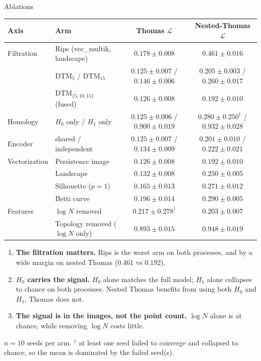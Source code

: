 \documentclass[aspectratio=169,10pt]{beamer}
\newcommand{\Loss}{\mathcal{L}}
\newcommand{\DTM}{\mathrm{DTM}}
\begin{document}
\begin{frame}{Ablations}
\centering\scriptsize
\begin{tabular}{llcc}
\toprule
Axis & Arm & Thomas $\Loss$ & Nested-Thomas $\Loss$ \\
\midrule
Filtration    & Rips (vec\_multik, landscape) & $0.178 \pm 0.008$ & $0.461 \pm 0.016$ \\
              & $\DTM_5$ / $\DTM_{15}$ & $0.125 \pm 0.007$ / $0.146 \pm 0.006$ & $0.205 \pm 0.003$ / $0.260 \pm 0.017$ \\
              & $\DTM_{\{5,10,15\}}$ (fused) & $0.126 \pm 0.008$ & $0.192 \pm 0.010$ \\
Homology      & $H_0$ only / $H_1$ only & $0.125 \pm 0.006$ / $0.900 \pm 0.019$ & $0.280 \pm 0.250^{\dagger}$ / $0.932 \pm 0.028$ \\
Encoder       & shared / independent & $0.125 \pm 0.007$ / $0.134 \pm 0.009$ & $0.201 \pm 0.010$ / $0.222 \pm 0.021$ \\
Vectorization & Persistence image & $0.126 \pm 0.008$ & $0.192 \pm 0.010$ \\
              & Landscape & $0.132 \pm 0.008$ & $0.250 \pm 0.005$ \\
              & Silhouette ($p=1$) & $0.165 \pm 0.013$ & $0.271 \pm 0.012$ \\
              & Betti curve & $0.196 \pm 0.014$ & $0.290 \pm 0.005$ \\
Features      & $\log N$ removed & $0.217 \pm 0.278^{\dagger}$ & $0.203 \pm 0.007$ \\
              & Topology removed ($\log N$ only) & $0.893 \pm 0.015$ & $0.948 \pm 0.019$ \\
\bottomrule
\end{tabular}
\vspace{8pt}

\raggedright\footnotesize
\begin{enumerate}\setlength\itemsep{2pt}
  \item \textbf{The filtration matters.} Rips is the worst arm on both
        processes, and by a wide margin on nested Thomas
        ($0.461$ vs $0.192$).
  \item \textbf{$H_0$ carries the signal.} $H_0$ alone matches the full model;
        $H_1$ alone collapses to chance on both processes. Nested Thomas benefits from using both $H_0$ and $H_1$, Thomas does not.
  \item \textbf{The signal is in the images, not the point count.} $\log N$
        alone is at chance, while removing $\log N$ costs little.
\end{enumerate}
\vspace{2pt}
{\color{cgray}\scriptsize $n=10$ seeds per arm. $^{\dagger}$ at least one seed
failed to converge and collapsed to chance, so the mean is dominated by the
failed seed(s).}
\end{frame}
\end{document}
